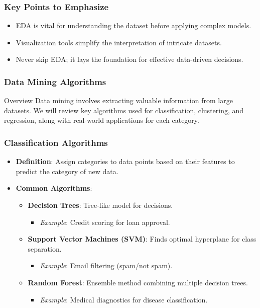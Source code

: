 \documentclass{beamer}
\begin{document}
\begin{frame}[fragile]
    \frametitle{Key Points to Emphasize}
    \begin{itemize}
        \item EDA is vital for understanding the dataset before applying complex models.
        \item Visualization tools simplify the interpretation of intricate datasets.
        \item Never skip EDA; it lays the foundation for effective data-driven decisions.
    \end{itemize}
\end{frame}

\begin{frame}[fragile]
    \frametitle{Data Mining Algorithms}
    \begin{block}{Overview}
        Data mining involves extracting valuable information from large datasets. We will review key algorithms used for classification, clustering, and regression, along with real-world applications for each category.
    \end{block}
\end{frame}

\begin{frame}[fragile]
    \frametitle{Classification Algorithms}
    \begin{itemize}
        \item \textbf{Definition}: Assign categories to data points based on their features to predict the category of new data.
        \item \textbf{Common Algorithms}:
        \begin{itemize}
            \item \textbf{Decision Trees}: Tree-like model for decisions.
            \begin{itemize}
                \item \textit{Example}: Credit scoring for loan approval.
            \end{itemize}
            \item \textbf{Support Vector Machines (SVM)}: Finds optimal hyperplane for class separation.
            \begin{itemize}
                \item \textit{Example}: Email filtering (spam/not spam).
            \end{itemize}
            \item \textbf{Random Forest}: Ensemble method combining multiple decision trees.
            \begin{itemize}
                \item \textit{Example}: Medical diagnostics for disease classification.
            \end{itemize}
        \end{itemize}
    \end{itemize}
\end{frame}
\end{document}
